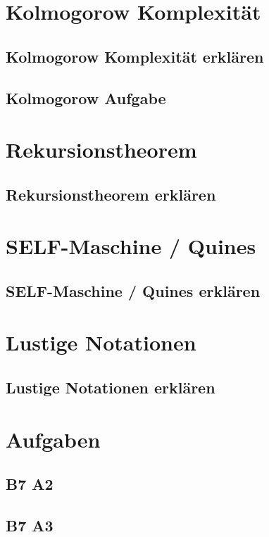



\section{Kolmogorow Komplexität}
\subsection{Kolmogorow Komplexität erklären}
\subsection{Kolmogorow Aufgabe}

\section{Rekursionstheorem}
\subsection{Rekursionstheorem erklären}

\section{SELF-Maschine / Quines}
\subsection{SELF-Maschine / Quines erklären}

\section{Lustige Notationen}
\subsection{Lustige Notationen erklären}

\section{Aufgaben}
\subsection{B7 A2}
\subsection{B7 A3}
